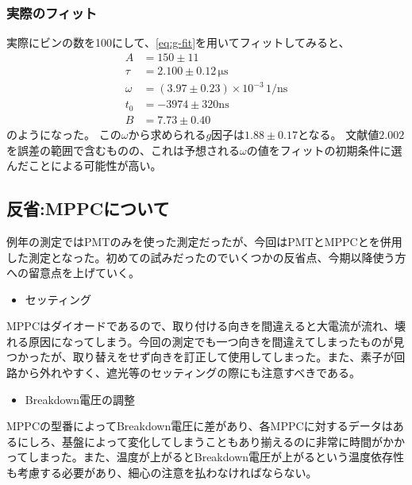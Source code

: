 \subsubsection{実際のフィット}
実際にビンの数を100にして、\ref{eq:g-fit}を用いてフィットしてみると、
\begin{align}
  A &= 150 \pm 11 \\
  \tau &= 2.100 \pm 0.12\,\mathrm{\mu s} \\
  \omega &= (3.97 \pm 0.23) \times 10^{-3}\,\mathrm{1/ns}\\
  t_0 &= -3974 \pm 320 \mathrm{ns} \\
  B &= 7.73 \pm 0.40
\end{align}
のようになった。
この$\omega$から求められる$g$因子は$1.88 \pm 0.17$となる。
文献値$2.002$を誤差の範囲で含むものの、これは予想される$\omega$の値をフィットの初期条件に選んだことによる可能性が高い。

\subsection{反省:MPPCについて}
例年の測定ではPMTのみを使った測定だったが、今回はPMTとMPPCとを併用した測定となった。初めての試みだったのでいくつかの反省点、今期以降使う方への留意点を上げていく。
\begin{itemize}
\item セッティング
\end{itemize}
MPPCはダイオードであるので、取り付ける向きを間違えると大電流が流れ、壊れる原因になってしまう。今回の測定でも一つ向きを間違えてしまったものが見つかったが、取り替えをせず向きを訂正して使用してしまった。また、素子が回路から外れやすく、遮光等のセッティングの際にも注意すべきである。
\begin{itemize}
\item Breakdown電圧の調整
\end{itemize}
MPPCの型番によってBreakdown電圧に差があり、各MPPCに対するデータはあるにしろ、基盤によって変化してしまうこともあり‎揃えるのに非常に時間がかかってしまった。また、温度が上がるとBreakdown電圧が上がるという温度依存性も考慮する必要があり、細心の注意を払わなければならない。
